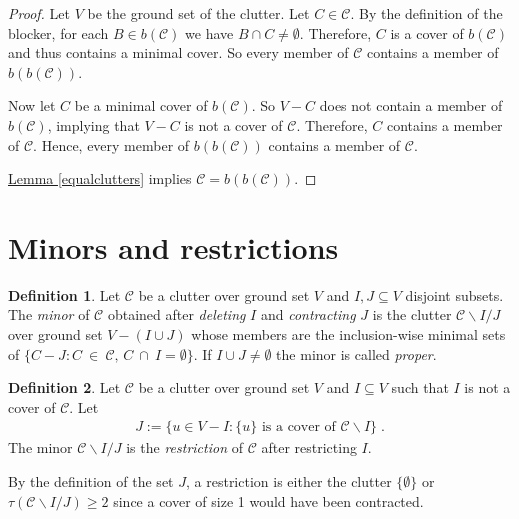 \documentclass[a4paper, 12pt]{scrbook}
\theoremstyle{definition}
\newtheorem*{definition}{Definition}
\begin{document}
\begin{proof}
    Let $V$ be the ground set of the clutter.
    Let $C \in \mathcal{C}$.
    By the definition of the blocker, for each $B \in b(\mathcal{C})$ we have $B\cap C \neq \emptyset$.
    Therefore, $C$ is a cover of $b(\mathcal{C})$ and thus contains a minimal cover.
    So every member of $\mathcal{C}$ contains a member of $b(b(\mathcal{C}))$.

    Now let $C$ be a minimal cover of $b(\mathcal{C})$.
    So $V-C$ does not contain a member of $b(\mathcal{C})$, implying that $V-C$ is not a cover of $\mathcal{C}$.
    Therefore, $C$ contains a member of $\mathcal{C}$.
    Hence, every member of $b(b(\mathcal{C}))$ contains a member of $\mathcal{C}$.

    \hyperref[equalclutters]{Lemma \ref*{equalclutters}} implies $\mathcal{C}=b(b(\mathcal{C}))$.
\end{proof}


\section{Minors and restrictions}
\begin{definition}
    Let $\mathcal{C}$ be a clutter over ground set $V$ and $I, J \subseteq V$ disjoint subsets.
    The \emph{minor} of $\mathcal{C}$ obtained after \emph{deleting} $I$ and \emph{contracting} $J$ is the clutter $\mathcal{C} \backslash I / J$ over ground set $V - (I \cup J)$ whose members are the inclusion-wise minimal sets of $\{C-J : C~\in~\mathcal{C},\, C~\cap~I = \emptyset\}$.
    If $I \cup J \neq \emptyset$ the minor is called \emph{proper}.
\end{definition}

\begin{definition}
    Let $\mathcal{C}$ be a clutter over ground set $V$ and $I \subseteq V$ such that $I$ is not a cover of $\mathcal{C}$.
    Let
    \begin{align*}
        J := \{u \in V-I : \{u\} \text{ is a cover of } \mathcal{C} \backslash I\} \;.
    \end{align*}
    The minor $\mathcal{C} \backslash I / J$ is the \emph{restriction} of $\mathcal{C}$ after restricting $I$.
\end{definition}

By the definition of the set $J$, a restriction is either the clutter $\{\emptyset\}$ or $\tau(\mathcal{C}\backslash I /J) \geq 2$ since a cover of size 1 would have been contracted.
\end{document}

